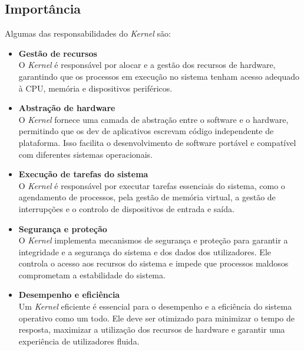 \subsection{Importância}
Algumas das responsabilidades do \textit{Kernel} são:
\begin{itemize}
  \item \textbf{Gestão de recursos}\\
  O \textit{Kernel} é responsável por alocar e a gestão dos recursos de hardware, garantindo que os processos em execução no sistema tenham acesso adequado à CPU, memória e dispositivos periféricos.
  \item \textbf{Abstração de hardware}\\
  O \textit{Kernel} fornece uma camada de abstração entre o software e o hardware, permitindo que os dev de aplicativos escrevam código independente de plataforma. Isso facilita o desenvolvimento de software portável e compatível com diferentes sistemas operacionais.
  \item \textbf{Execução de tarefas do sistema}\\
  O \textit{Kernel} é responsável por executar tarefas essenciais do sistema, como o agendamento de processos, pela gestão de memória virtual, a gestão de interrupções e o controlo de dispositivos de entrada e saída.
  \item \textbf{Segurança e proteção}\\
  O \textit{Kernel} implementa mecanismos de segurança e proteção para garantir a integridade e a segurança do sistema e dos dados dos utilizadores. Ele controla o acesso aos recursos do sistema e impede que processos maldosos comprometam a estabilidade do sistema.
  \item \textbf{Desempenho e eficiência}\\
  Um \textit{Kernel} eficiente é essencial para o desempenho e a eficiência do sistema operativo como um todo. Ele deve ser otimizado para minimizar o tempo de resposta, maximizar a utilização dos recursos de hardware e garantir uma experiência de utilizadores fluida.
\end{itemize}

